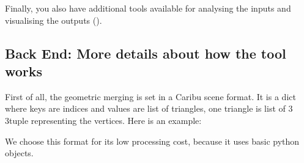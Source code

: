 \documentclass[letterpaper,10pt,english]{sphinxmanual}
\begin{document}
\sphinxAtStartPar
Finally, you also have additional tools available for analysing the inputs and visualising the outputs ({\hyperref[\detokenize{others:other}]{}}).


\subsection{Back End: More details about how the tool works}
\label{\detokenize{architecture:back-end-more-details-about-how-the-tool-works}}\label{\detokenize{architecture:backend}}
\sphinxAtStartPar
First of all, the geometric merging is set in a Caribu scene format. It is a dict where keys are indices and values are list of triangles, one triangle is list of 3 3\sphinxhyphen{}tuple representing the vertices.
Here is an example:

\begin{sphinxVerbatim}[commandchars=\\\{\}]
  \PYG{p}{[}  \PYG{p}{]}
  \PYG{p}{[}  \PYG{p}{]}

  \PYG{p}{[}  \PYG{p}{]}

     \PYG{p}{[} \PYG{p}{]} 
                  \PYG{p}{[}\PYG{p}{]} 
\end{sphinxVerbatim}

\sphinxAtStartPar
We choose this format for its low processing cost, because it uses basic python objects.
\end{document}
